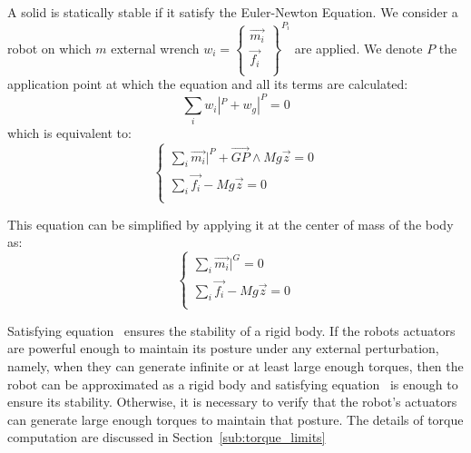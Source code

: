 A solid is statically stable if it satisfy the Euler-Newton Equation.
We consider a robot on which $m$ external wrench $w_i = \left\{ \begin{array}{r}
    \vec{m_i}\\
    \vec{f_i}\\
\end{array} \right\}^{P_i}$ are applied.
We denote $P$ the application point at which the equation and all its terms are calculated:
\begin{equation}
  \sum\limits_i w_i|^P + w_g|^P = 0
\end{equation}
which is equivalent to:
\begin{equation}
\left\{
\begin{array}{r}
  \sum\limits_i \vec{m_i}|^P + \overrightarrow{GP}\wedge Mg\vec{z} = 0 \\
  \sum\limits_i \vec{f_i} - Mg\vec{z} = 0 \\
\end{array}
\right.
\end{equation}

This equation can be simplified by applying it at the center of mass of the body as:
\begin{equation}
  \left\{
  \begin{array}{r}
    \sum\limits_i \vec{m_i}|^G = 0 \\
    \sum\limits_i \vec{f_i} - Mg\vec{z} = 0 \\
  \end{array}
  \right.
\label{eq:stability}
\end{equation}

Satisfying equation~ ensures the stability of a rigid body.
If the robots actuators are powerful enough to maintain its posture under any external perturbation, namely, when they can generate infinite or at least large enough torques, then the robot can be approximated as a rigid body and satisfying equation~ is enough to ensure its stability.
Otherwise, it is necessary to verify that the robot's actuators can generate large enough torques to maintain that posture.
The details of torque computation are discussed in Section~\ref{sub:torque_limits}

